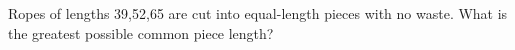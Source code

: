 Ropes of lengths 39,52,65 are cut into equal-length pieces with no waste. What is the greatest possible common piece length?
